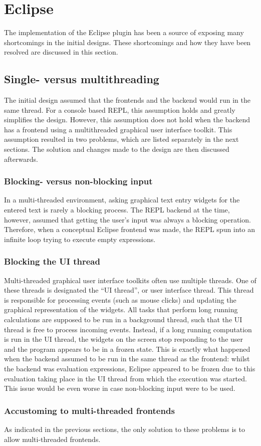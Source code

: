 \section{Eclipse}
\label{sec:eclipse}

The implementation of the Eclipse plugin has been a source of exposing many
shortcomings in the initial designs. These shortcomings and how they have been
resolved are discussed in this section.

\subsection{Single- versus multithreading}
\label{ssec:threading}

The initial design assumed that the frontends and the backend would run in the
same thread. For a console based REPL, this assumption holds and greatly
simplifies the design. However, this assumption does not hold when the backend
has a frontend using a multithreaded graphical user interface toolkit. This
assumption resulted in two problems, which are listed separately in the next
sections. The solution and changes made to the design are then discussed
afterwards.

\subsubsection{Blocking- versus non-blocking input}

In a multi-threaded environment, asking graphical text entry widgets for the
entered text is rarely a blocking process. The REPL backend at the time,
however, assumed that getting the user's input was always a blocking operation.
Therefore, when a conceptual Eclipse frontend was made, the REPL spun into an
infinite loop trying to execute empty expressions.

\subsubsection{Blocking the UI thread}

Multi-threaded graphical user interface toolkits often use multiple threads. One
of these threads is designated the ``UI thread'', or user interface thread. This
thread is responsible for processing events (such as mouse clicks) and updating
the graphical representation of the widgets. All tasks that perform long running
calculations are supposed to be run in a background thread, such that the UI
thread is free to process incoming events. Instead, if a long running
computation is run in the UI thread, the widgets on the screen stop responding
to the user and the program appears to be in a frozen state.  This is exactly
what happened when the backend assumed to be run in the same thread as the
frontend: whilst the backend was evaluation expressions, Eclipse appeared to be
frozen due to this evaluation taking place in the UI thread from which the
execution was started. This issue would be even worse in case non-blocking input
were to be used.

\subsubsection{Accustoming to multi-threaded frontends}

As indicated in the previous sections, the only solution to these problems is to
allow multi-threaded frontends. 

